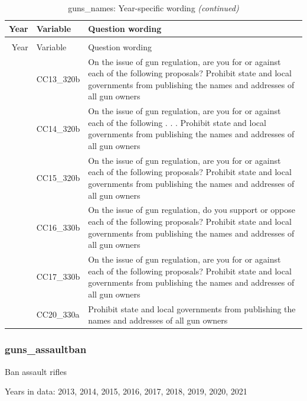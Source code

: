 \documentclass[
  12pt]{article}
\begin{document}
\begin{longtable}[t]{rl>{\raggedright\arraybackslash}p{10cm}}
\caption{\label{tab:unnamed-chunk-5}guns\_names: Year-specific wording}\\
\toprule
Year & Variable & Question wording\\
\midrule
\endfirsthead
\caption[]{guns\_names: Year-specific wording \textit{(continued)}}\\
\toprule
Year & Variable & Question wording\\
\midrule
\endhead

\endfoot
\bottomrule
\endlastfoot
2013 & CC13\_320b & On the issue of gun regulation, are you for or against each of the following proposals? Prohibit state and local governments from publishing the names and addresses of all gun owners\\
\addlinespace
2014 & CC14\_320b & On the issue of gun regulation, are you for or against each of the following . . . Prohibit state and local governments from publishing the names and addresses of all gun owners\\
\addlinespace
2015 & CC15\_320b & On the issue of gun regulation, are you for or against each of the following proposals? Prohibit state and local governments from publishing the names and addresses of all gun owners\\
\addlinespace
2016 & CC16\_330b & On the issue of gun regulation, do you support or oppose each of the following proposals? Prohibit state and local governments from publishing the names and addresses of all gun owners\\
\addlinespace
2017 & CC17\_330b & On the issue of gun regulation, are you for or against each of the following proposals? Prohibit state and local governments from publishing the names and addresses of all gun owners\\
\addlinespace
2020 & CC20\_330a & Prohibit state and local governments from publishing the names and addresses of all gun owners\\*
\end{longtable}
\endgroup{}

\hypertarget{guns_assaultban}{%
\subsubsection{guns\_assaultban}\label{guns_assaultban}}

Ban assault rifles

Years in data: 2013, 2014, 2015, 2016, 2017, 2018, 2019, 2020,
2021\begingroup\fontsize{10}{12}\selectfont
\end{document}
